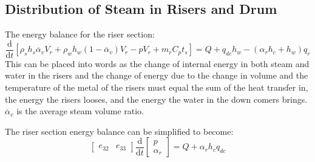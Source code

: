 
    \subsection{Distribution of Steam in Risers and Drum}
    
    
        The energy balance for the riser section:
        $$\frac{\mathrm{d} }{\mathrm{d} t}\left [ \rho_s h_s \overline{\alpha}_v V_{r} + \rho_w h_w\left ( 1 - \overline{\alpha}_v \right ) V_{r} - pV_r + m_r C_p t_s\right ] = Q + q_{dc} h_w - \left ( \alpha_r h_c + h_w \right )q_{r} $$\cite{Astrom}
        This can be placed into words as the change of internal energy in both steam and water in the risers and the change of energy due to the change in volume and the temperature of the metal of the risers  must equal the sum of the heat transfer in, the energy the risers looses, and the energy the water in the down comers brings. $\overline{\alpha}_v$ is the average steam volume ratio.
        
        The riser section energy balance can be simplified to become:\cite{Astrom}
        \begin{equation}
            \label{eq:Riser_Energy_Balance}
            \left [ \begin{matrix}  e_{32}& e_{33}\end{matrix} \right ] \frac{\mathrm{d} }{\mathrm{d} t} \left [ \begin{matrix}  p\\ \alpha_r\end{matrix} \right ] = Q + \alpha_r h_c q_{dc} 
        \end{equation}
        
